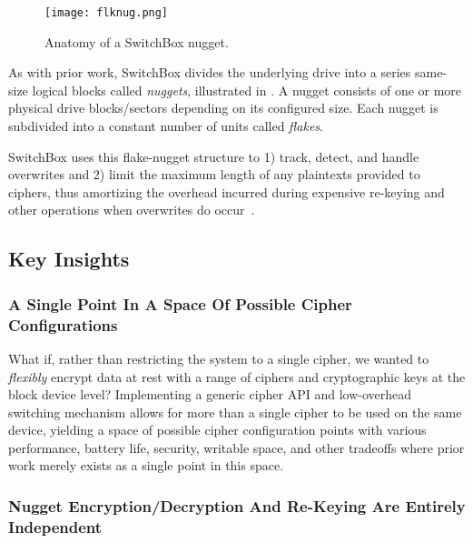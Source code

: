 \begin{figure}[ht]
   \centering
   \texttt{[image: flknug.png]}
   \caption{Anatomy of a SwitchBox nugget.}\label{fig:flknug}
\end{figure}

As with prior work, SwitchBox divides the underlying drive into a series
same-size logical blocks called \emph{nuggets}, illustrated in .
A nugget consists of one or more physical drive blocks/sectors depending on its
configured size. Each nugget is subdivided into a constant number of units
called \emph{flakes}.

SwitchBox uses this flake-nugget structure to 1) track, detect, and handle
overwrites and 2) limit the maximum length of any plaintexts provided to
ciphers, thus amortizing the overhead incurred during expensive re-keying and
other operations when overwrites do occur~\cite{StrongBox}.

\subsection{Key Insights}

\subsubsection{A Single Point In A Space Of Possible Cipher Configurations}

What if, rather than restricting the system to a single cipher, we wanted to
\textit{flexibly} encrypt data at rest with a range of ciphers and cryptographic
keys at the block device level? Implementing a generic cipher API and
low-overhead switching mechanism allows for more than a single cipher to be used
on the same device, yielding a space of possible cipher configuration points
with various performance, battery life, security, writable space, and other
tradeoffs where prior work merely exists as a single point in this space.

\subsubsection{Nugget Encryption/Decryption And Re-Keying Are Entirely Independent}

